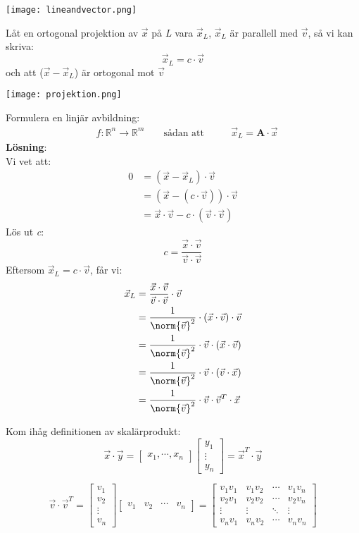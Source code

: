 \begin{center}
	\texttt{[image: lineandvector.png]}
\end{center}
Låt en ortogonal projektion av $\vec{x}$ på \textit{L} vara $\vec{x}_L$, $\vec{x}_L$ är parallell med $\vec{v}$, så vi kan skriva:
\[
    \vec{x}_L = c \cdot \vec{v}
\]
och att ($\vec{x} - \vec{x}_L$) är ortogonal mot $\vec{v}$
\begin{center}
	\texttt{[image: projektion.png]}
\end{center}
Formulera en linjär avbildning:
\begin{align*}
&f: \mathbb{R}^n \rightarrow \mathbb{R}^m
&& \mbox{ sådan att }
&&& \vec{x}_L = \mathbf{A} \cdot \vec{x}
\end{align*}
\textbf{Lösning}:\\
Vi vet att:
\begin{align*}
0 &= (\vec{x} - \vec{x}_L) \cdot \vec{v} \\
&= (\vec{x} - (c \cdot \vec{v})) \cdot \vec{v} \\
&= \vec{x} \cdot \vec{v} - c \cdot (\vec{v} \cdot \vec{v})
\end{align*}
Lös ut \textit{c}:
\[
    c = \frac{\vec{x} \cdot \vec{v}}{\vec{v} \cdot \vec{v}}
\]
Eftersom $\vec{x}_L = c \cdot \vec{v}$, får vi:
\begin{align*}
\vec{x}_L &= \frac{\vec{x} \cdot \vec{v}}{\vec{v} \cdot \vec{v}} \cdot \vec{v}\\
&= \frac{1}{\norm{\vec{v}}^2} \cdot (\vec{x} \cdot \vec{v}) \cdot \vec{v} \\
&= \frac{1}{\norm{\vec{v}}^2} \cdot \vec{v} \cdot (\vec{x} \cdot \vec{v}) \\
&= \frac{1}{\norm{\vec{v}}^2} \cdot \vec{v} \cdot (\vec{v} \cdot \vec{x}) \\
&= \frac{1}{\norm{\vec{v}}^2} \cdot \vec{v} \cdot \vec{v}^T \cdot \vec{x}
\end{align*}
\begin{Rem}
    Kom ihåg definitionen av skalärprodukt:
    \[
        \vec{x} \cdot \vec{y} = \begin{bmatrix} x_1, \cdots, x_n \end{bmatrix}\begin{bmatrix} y_1\\\vdots\\y_n \end{bmatrix} = \vec{x}^T \cdot \vec{y}
    \]
\end{Rem}
\[
    \vec{v} \cdot \vec{v}^T = \begin{bmatrix} v_1\\v_2\\\vdots\\v_n \end{bmatrix} \begin{bmatrix} v_1&v_2&\cdots&v_n \end{bmatrix} = 
    \begin{bmatrix} 
    v_1v_1 & v_1v_2 & \cdots & v_1v_n \\
    v_2v_1 & v_2v_2 & \cdots & v_2v_n \\
    \vdots & \vdots & \ddots & \vdots \\
    v_nv_1 & v_nv_2 & \cdots & v_nv_n
    \end{bmatrix}
\]
